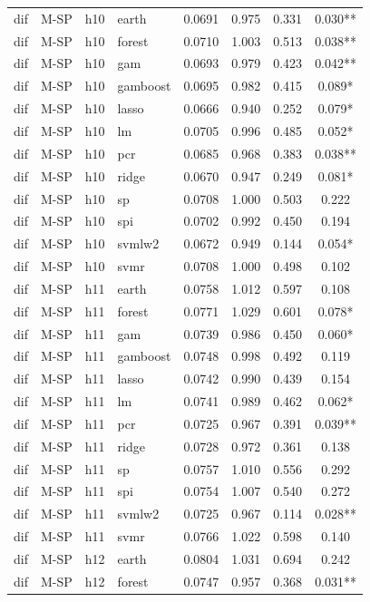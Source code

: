 \begin{ThreePartTable}
\begin{longtable}[t]{llclcccc}
\addlinespace
dif & M-SP & h10 & earth & 0.0691 & 0.975 & 0.331 & 0.030**\\
dif & M-SP & h10 & forest & 0.0710 & 1.003 & 0.513 & 0.038**\\
dif & M-SP & h10 & gam & 0.0693 & 0.979 & 0.423 & 0.042**\\
dif & M-SP & h10 & gamboost & 0.0695 & 0.982 & 0.415 & 0.089*\\
dif & M-SP & h10 & lasso & 0.0666 & 0.940 & 0.252 & 0.079*\\
dif & M-SP & h10 & lm & 0.0705 & 0.996 & 0.485 & 0.052*\\
dif & M-SP & h10 & pcr & 0.0685 & 0.968 & 0.383 & 0.038**\\
dif & M-SP & h10 & ridge & 0.0670 & 0.947 & 0.249 & 0.081*\\
dif & M-SP & h10 & sp & 0.0708 & 1.000 & 0.503 & 0.222\\
dif & M-SP & h10 & spi & 0.0702 & 0.992 & 0.450 & 0.194\\
dif & M-SP & h10 & svmlw2 & 0.0672 & 0.949 & 0.144 & 0.054*\\
dif & M-SP & h10 & svmr & 0.0708 & 1.000 & 0.498 & 0.102\\
\addlinespace
dif & M-SP & h11 & earth & 0.0758 & 1.012 & 0.597 & 0.108\\
dif & M-SP & h11 & forest & 0.0771 & 1.029 & 0.601 & 0.078*\\
dif & M-SP & h11 & gam & 0.0739 & 0.986 & 0.450 & 0.060*\\
dif & M-SP & h11 & gamboost & 0.0748 & 0.998 & 0.492 & 0.119\\
dif & M-SP & h11 & lasso & 0.0742 & 0.990 & 0.439 & 0.154\\
dif & M-SP & h11 & lm & 0.0741 & 0.989 & 0.462 & 0.062*\\
dif & M-SP & h11 & pcr & 0.0725 & 0.967 & 0.391 & 0.039**\\
dif & M-SP & h11 & ridge & 0.0728 & 0.972 & 0.361 & 0.138\\
dif & M-SP & h11 & sp & 0.0757 & 1.010 & 0.556 & 0.292\\
dif & M-SP & h11 & spi & 0.0754 & 1.007 & 0.540 & 0.272\\
dif & M-SP & h11 & svmlw2 & 0.0725 & 0.967 & 0.114 & 0.028**\\
dif & M-SP & h11 & svmr & 0.0766 & 1.022 & 0.598 & 0.140\\
\addlinespace
dif & M-SP & h12 & earth & 0.0804 & 1.031 & 0.694 & 0.242\\
dif & M-SP & h12 & forest & 0.0747 & 0.957 & 0.368 & 0.031**\\

\end{longtable}
\end{ThreePartTable}

